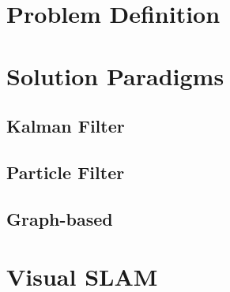  





\section{Problem Definition}


\section{Solution Paradigms} 

\subsection{Kalman Filter}

\subsection{Particle Filter}

\subsection{Graph-based}


\section{Visual SLAM}


